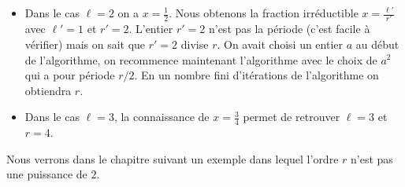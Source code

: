 \documentclass[11pt,class=report,crop=false]{standalone}
\begin{document}
\begin{itemize}
\begin{itemize}
  \item Dans le cas $\ell=2$ on a $x=\frac12$.
    Nous obtenons la fraction irréductible $x= \frac{\ell'}{r'}$ avec $\ell'=1$ et $r'=2$. L'entier $r'=2$ n'est pas la période (c'est facile à vérifier) mais on sait que $r'=2$ divise $r$. On avait choisi un entier $a$ au début de l'algorithme, on recommence maintenant l'algorithme avec le choix de $a^2$ qui a pour période $r/2$. En un nombre fini d'itérations de l'algorithme on obtiendra $r$.
    
  \item Dans le cas $\ell=3$, la connaissance de $x=\frac34$ permet de retrouver $\ell=3$ et $r=4$. 
  \end{itemize}
  
\end{itemize}

\bigskip

Nous verrons dans le chapitre suivant un exemple dans lequel l'ordre $r$ n'est pas une puissance de $2$.
\end{document}
